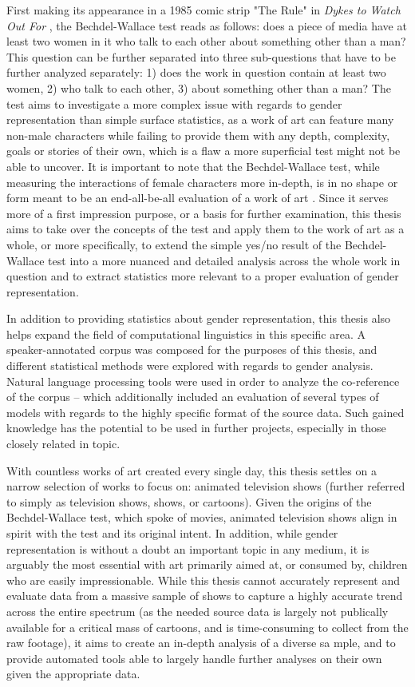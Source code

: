 \documentclass[a4paper, 11pt]{article}
\begin{document}
First making its appearance in a 1985 comic strip "The Rule" in \textit{Dykes to Watch Out For} \citep{bechdel}, the Bechdel-Wallace test reads as follows: does a piece of media have at least two women in it who talk to each other about something other than a man? This question can be further separated into three sub-questions that have to be further analyzed separately: 1) does the work in question contain at least two women, 2) who talk to each other, 3) about something other than a man? The test aims to investigate a more complex issue with regards to gender representation than simple surface statistics, as a work of art can feature many non-male characters while failing to provide them with any depth, complexity, goals or stories of their own, which is a flaw a more superficial test might not be able to uncover. It is important to note that the Bechdel-Wallace test, while measuring the interactions of female characters more in-depth, is in no shape or form meant to be an end-all-be-all evaluation of a work of art \citep{zeisler}. Since it serves more of a first impression purpose, or a basis for further examination, this thesis aims to take over the concepts of the test and apply them to the work of art as a whole, or more specifically, to extend the simple yes/no result of the Bechdel-Wallace test into a more nuanced and detailed analysis across the whole work in question and to extract statistics more relevant to a proper evaluation of gender representation.

In addition to providing statistics about gender representation, this thesis also helps expand the field of computational linguistics in this specific area. A speaker-annotated corpus was composed for the purposes of this thesis, and different statistical methods were explored with regards to gender analysis. Natural language processing tools were used in order to analyze the co-reference of the corpus -- which additionally included an evaluation of several types of models with regards to the highly specific format of the source data. Such gained knowledge has the potential to be used in further projects, especially in those closely related in topic.

With countless works of art created every single day, this thesis settles on a narrow selection of works to focus on: animated television shows (further referred to simply as television shows, shows, or cartoons). Given the origins of the Bechdel-Wallace test, which spoke of movies, animated television shows align in spirit with the test and its original intent. In addition, while gender representation is without a doubt an important topic in any medium, it is arguably the most essential with art primarily aimed at, or consumed by, children who are easily impressionable. While this thesis cannot accurately represent and evaluate data from a massive sample of shows to capture a highly accurate trend across the entire spectrum (as the needed source data is largely not publically available for a critical mass of cartoons, and is time-consuming to collect from the raw footage), it aims to create an in-depth analysis of a diverse sa	mple, and to provide automated tools able to largely handle further analyses on their own given the appropriate data.
\end{document}
